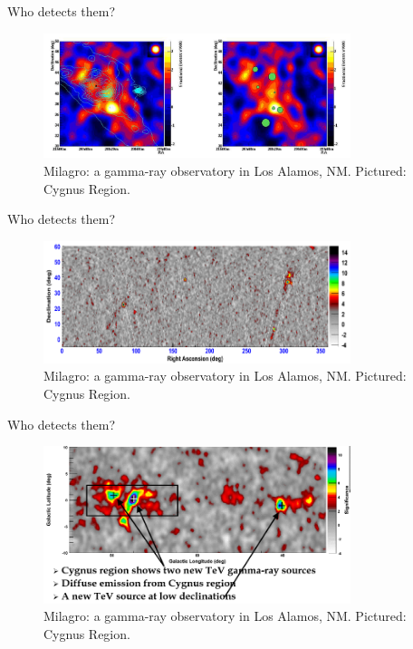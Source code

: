 \documentclass{beamer}
\begin{document}
\begin{frame}{Who detects them?}
\begin{figure}
\centering
\includegraphics[width=0.8\textwidth]{figures/milagro_2.png}
\caption{\label{fig:x2} Milagro: a gamma-ray observatory in Los Alamos, NM.  Pictured: Cygnus Region.}
\end{figure}
\end{frame}

\begin{frame}{Who detects them?}
\begin{figure}
\centering
\includegraphics[width=0.8\textwidth]{figures/milagro_3.png}
\caption{\label{fig:x3} Milagro: a gamma-ray observatory in Los Alamos, NM.  Pictured: Cygnus Region.}
\end{figure}
\end{frame}

\begin{frame}{Who detects them?}
\begin{figure}
\centering
\includegraphics[width=0.8\textwidth]{figures/milagro_6.png}
\caption{\label{fig:x4} Milagro: a gamma-ray observatory in Los Alamos, NM.  Pictured: Cygnus Region.}
\end{figure}
\end{frame}
\end{document}
